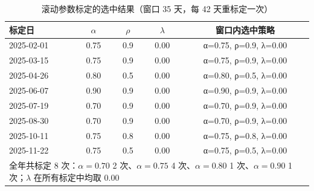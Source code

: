 \begin{table}[htbp]
  \centering
  \caption{滚动参数标定的选中结果（窗口 35 天，每 42 天重标定一次）}
  \label{tab:p2-calib}
  \begin{tabular}{lcccc}
    \toprule
    标定日 & $\alpha$ & $\rho$ & $\lambda$ & 窗口内选中策略 \\
    \midrule
    2025-02-01 & 0.75 & 0.9 & 0.00 & α=0.75, ρ=0.9, λ=0.00 \\
    2025-03-15 & 0.75 & 0.9 & 0.00 & α=0.75, ρ=0.9, λ=0.00 \\
    2025-04-26 & 0.80 & 0.5 & 0.00 & α=0.80, ρ=0.5, λ=0.00 \\
    2025-06-07 & 0.90 & 0.9 & 0.00 & α=0.90, ρ=0.9, λ=0.00 \\
    2025-07-19 & 0.70 & 0.9 & 0.00 & α=0.70, ρ=0.9, λ=0.00 \\
    2025-08-30 & 0.70 & 0.9 & 0.00 & α=0.70, ρ=0.9, λ=0.00 \\
    2025-10-11 & 0.75 & 0.8 & 0.00 & α=0.75, ρ=0.8, λ=0.00 \\
    2025-11-22 & 0.75 & 0.5 & 0.00 & α=0.75, ρ=0.5, λ=0.00 \\
    \midrule
    \multicolumn{5}{l}{\footnotesize 全年共标定 8 次：$\alpha=0.70$ 2 次、$\alpha=0.75$ 4 次、$\alpha=0.80$ 1 次、$\alpha=0.90$ 1 次；$\lambda$ 在所有标定中均取 $0.00$} \\
    \bottomrule
  \end{tabular}
\end{table}
